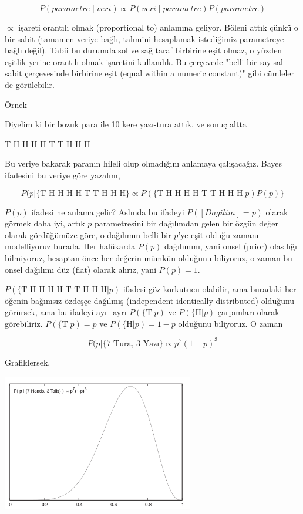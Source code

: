 \documentclass[12pt,fleqn]{article}\usepackage{../../common}
\begin{document}
$$ P(parametre \mid veri ) \propto P(veri \mid parametre)P(parametre) $$

$\propto$ işareti orantılı olmak (proportional to) anlamına geliyor. Böleni
attık çünkü o bir sabit (tamamen veriye bağlı, tahmini hesaplamak
istediğimiz parametreye bağlı değil). Tabii bu durumda sol ve sağ taraf
birbirine eşit olmaz, o yüzden eşitlik yerine orantılı olmak işaretini
kullandık. Bu çerçevede "belli bir sayısal sabit çerçevesinde birbirine
eşit (equal within a numeric constant)" gibi cümleler de görülebilir. 

Örnek

Diyelim ki bir bozuk para ile 10 kere yazı-tura attık, ve sonuç altta

T H H H H T T H H H

Bu veriye bakarak paranın hileli olup olmadığını anlamaya
çalışacağız. Bayes ifadesini bu veriye göre yazalım,

$$ P(p | \{ \textrm{T H H H H T T H H H} \} \propto 
P(\{ \textrm{T H H H H T T H H H} | p) P(p) \}
$$

$P(p)$ ifadesi ne anlama gelir? Aslında bu ifadeyi $P([Dagilim] = p)$ olarak
görmek daha iyi, artık $p$ parametresini bir dağılımdan gelen bir özgün değer
olarak gördüğümüze göre, o dağılımın belli bir $p$'ye eşit olduğu zamanı
modelliyoruz burada. Her halükarda $P(p)$ dağılımını, yani onsel (prior)
olasılığı bilmiyoruz, hesaptan önce her değerin mümkün olduğunu biliyoruz, o
zaman bu onsel dağılımı düz (flat) olarak alırız, yani $P(p) = 1$.

$P(\{\textrm{T H H H H T T H H H} | p)$ ifadesi göz korkutucu olabilir, ama
buradaki her öğenin bağımsız özdeşçe dağılmış (independent identically
distributed) olduğunu görürsek, ama bu ifadeyi ayrı ayrı
$P(\{\textrm{T}|p)$ ve $P(\{\textrm{H}|p)$ çarpımları olarak
görebiliriz. $P(\{\textrm{T}|p) = p$ ve $P(\{\textrm{H}|p)=1-p$ olduğunu
biliyoruz. O zaman

$$ P(p | \{ \textrm{7 Tura, 3 Yazı} \} \propto
p^7(1-p)^3
$$

Grafiklersek, 

\includegraphics[height=6cm]{stat_appendix_01.png}
\end{document}
